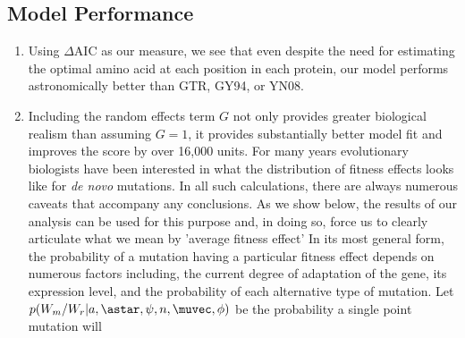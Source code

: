 \documentclass{article}
\newcommand{\DeltaAIC}{\ensuremath{\Delta\text{AIC}}\xspace}
\begin{document}
\subsection*{Model Performance}
\begin{enumerate}
\item Using \DeltaAIC as our measure, we see that even despite the need for estimating the optimal amino acid at each position in each protein, our model performs astronomically better than GTR, GY94, or YN08.
\item Including the random effects term $G$ not only provides greater biological realism than assuming $G =1$, it provides substantially better model fit and improves the \DAIC score by over 16,000 units.
For many years evolutionary biologists have been interested in what the distribution of fitness effects looks like for \emph{de novo} mutations.
In all such calculations, there are always numerous caveats that accompany any conclusions.
As we show below, the results of our analysis can be used for this purpose and, in doing so, force us to clearly articulate what we mean by 'average fitness effect'
In its most general form, the probability of a mutation having a particular fitness effect depends on numerous factors including, the current degree of adaptation of the gene, its expression level, and the probability of each alternative type of mutation.
Let $p(W_m/W_r| a, \astar, \psi, n, \muvec, \phi)$ be the probability a single point mutation will 




\end{enumerate}
\end{document}
